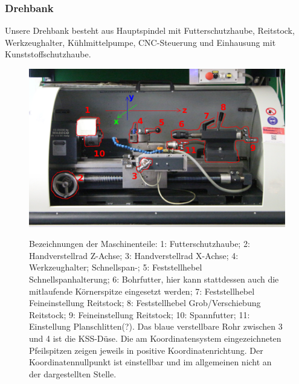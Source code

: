 \documentclass{\basedir/fablab-document}
\begin{document}
\subsubsection{Drehbank}
Unsere Drehbank besteht aus Hauptspindel mit Futterschutzhaube, Reitstock, Werkzeughalter, Kühlmittelpumpe, CNC-Steuerung und Einhausung mit Kunststoffschutzhaube.
\begin{figure}[ht]
\centering
\includegraphics[width = 0.9\linewidth]{img/drehbank-uebersicht-beschreibung} \\
\caption{Bezeichnungen der Maschinenteile: 1: Futterschutzhaube; 2: Handverstellrad Z-Achse; 3: Handverstellrad X-Achse; 4: Werkzeughalter; Schnellspan-; 5: Feststellhebel Schnellspanhalterung; 6: Bohrfutter, hier kann stattdessen auch die mitlaufende Körnerspitze eingesetzt werden; 7: Feststellhebel Feineinstellung Reitstock; 8: Feststellhebel Grob/Verschiebung Reitstock; 9: Feineinstellung Reitstock; 10: Spannfutter; 11: Einstellung Planschlitten(?). Das blaue verstellbare Rohr zwischen 3 und 4 ist die KSS-Düse. Die am Koordinatensystem eingezeichneten Pfeilspitzen zeigen jeweils in positive Koordinatenrichtung. Der Koordinatennullpunkt ist einstellbar und im allgemeinen nicht an der dargestellten Stelle.}
\end{figure}
\end{document}
